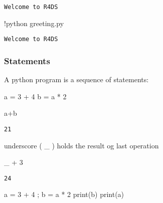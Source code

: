 \documentclass[
  letterpaper,
  DIV=11,
  numbers=noendperiod]{scrreprt}
\newenvironment{Shaded}{\begin{snugshade}}{\end{snugshade}}
\newcommand{\BuiltInTok}[1]{\textcolor[rgb]{0.00,0.46,0.62}{#1}}
\newcommand{\BuiltInTok}[1]{\textcolor[rgb]{0.00,0.48,0.65}{#1}}
\newcommand{\DecValTok}[1]{\textcolor[rgb]{0.68,0.00,0.00}{#1}}
\newcommand{\NormalTok}[1]{\textcolor[rgb]{0.00,0.46,0.62}{#1}}
\newcommand{\OperatorTok}[1]{\textcolor[rgb]{0.37,0.37,0.37}{#1}}
\newcommand{\NormalTok}[1]{\textcolor[rgb]{0.00,0.48,0.65}{#1}}
\newcommand{\OperatorTok}[1]{\textcolor[rgb]{0.37,0.37,0.37}{#1}}
\begin{document}
\begin{verbatim}
Welcome to R4DS
\end{verbatim}

\begin{Shaded}
\begin{Highlighting}[]
\OperatorTok{!}\NormalTok{python greeting.py}
\end{Highlighting}
\end{Shaded}

\begin{verbatim}
Welcome to R4DS
\end{verbatim}

\hypertarget{statements}{%
\subsubsection{Statements}\label{statements}}

A python program is a sequence of statements:

\begin{Shaded}
\begin{Highlighting}[]
\NormalTok{a }\OperatorTok{=} \DecValTok{3} \OperatorTok{+} \DecValTok{4}
\NormalTok{b }\OperatorTok{=}\NormalTok{ a }\OperatorTok{*} \DecValTok{2}

\NormalTok{a}\OperatorTok{+}\NormalTok{b}
\end{Highlighting}
\end{Shaded}

\begin{verbatim}
21
\end{verbatim}

underscore ( \_ ) holds the result og last operation

\begin{Shaded}
\begin{Highlighting}[]
\NormalTok{\_ }\OperatorTok{+} \DecValTok{3}
\end{Highlighting}
\end{Shaded}

\begin{verbatim}
24
\end{verbatim}

\begin{Shaded}
\begin{Highlighting}[]
\NormalTok{a }\OperatorTok{=} \DecValTok{3} \OperatorTok{+} \DecValTok{4} \OperatorTok{;}\NormalTok{ b }\OperatorTok{=}\NormalTok{ a }\OperatorTok{*} \DecValTok{2}
\BuiltInTok{print}\NormalTok{(b)}
\BuiltInTok{print}\NormalTok{(a)}
\end{Highlighting}
\end{Shaded}
\end{document}
